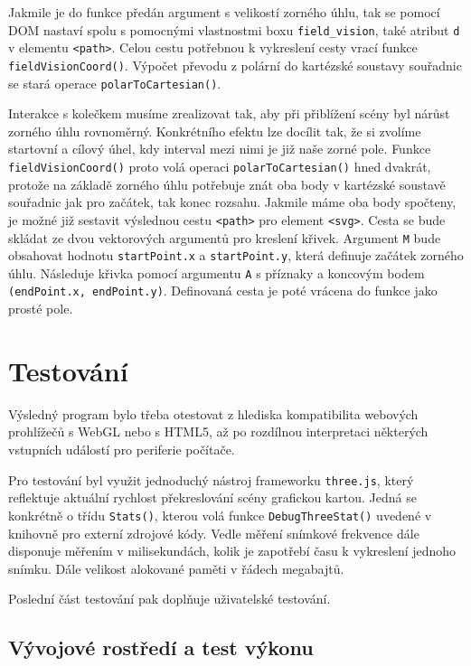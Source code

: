 Jakmile je do funkce předán argument s velikostí zorného úhlu, tak se pomocí DOM nastaví spolu s  pomocnými vlastnostmi boxu \texttt{field\_vision}, také atribut \texttt{d} v elementu \texttt{<path>}. Celou cestu potřebnou k vykreslení cesty vrací funkce \texttt{fieldVisionCoord()}. Výpočet převodu z polární  do kartézské soustavy souřadnic  se stará operace \texttt{polarToCartesian()}.

Interakce s kolečkem musíme zrealizovat tak, aby při přiblížení scény byl nárůst zorného úhlu rovnoměrný. Konkrétního efektu lze docílit tak, že si zvolíme startovní a cílový úhel, kdy interval mezi nimi je již naše zorné pole. Funkce \texttt{fieldVisionCoord()} proto volá operaci \texttt{polarToCartesian()} hned dvakrát, protože na základě zorného úhlu potřebuje znát oba body v kartézské soustavě souřadnic jak pro začátek, tak konec rozsahu. Jakmile máme oba body spočteny, je možné již sestavit výslednou cestu \texttt{<path>} pro element \texttt{<svg>}. Cesta se bude skládat ze dvou vektorových argumentů pro kreslení křivek. Argument \texttt{M} bude obsahovat hodnotu \texttt{startPoint.x} a \texttt{startPoint.y}, která definuje začátek zorného úhlu. Následuje křivka pomocí argumentu \texttt{A} s příznaky a  koncovým bodem \texttt{(endPoint.x, endPoint.y)}. Definovaná cesta je poté vrácena do funkce \texttt{\createFieldVision} jako prosté pole.




\chapter{Testování}
\label{chapter:5}
Výsledný program bylo třeba otestovat z  hlediska kompatibilita webových prohlížečů  s WebGL nebo s HTML5, až po rozdílnou interpretaci některých vstupních událostí pro periferie počítače. 

Pro testování byl využit jednoduchý nástroj frameworku \texttt{three.js}, který reflektuje aktuální rychlost překreslování scény grafickou kartou. Jedná se konkrétně o třídu \texttt{Stats()}, kterou volá funkce \texttt{DebugThreeStat()} uvedené v knihovně pro externí zdrojové kódy. Vedle měření snímkové frekvence dále disponuje měřením v milisekundách, kolik je zapotřebí času k vykreslení jednoho snímku. Dále velikost alokované paměti v řádech megabajtů.

Poslední část testování pak doplňuje uživatelské testování.

\section*{Vývojové rostředí a test výkonu}

